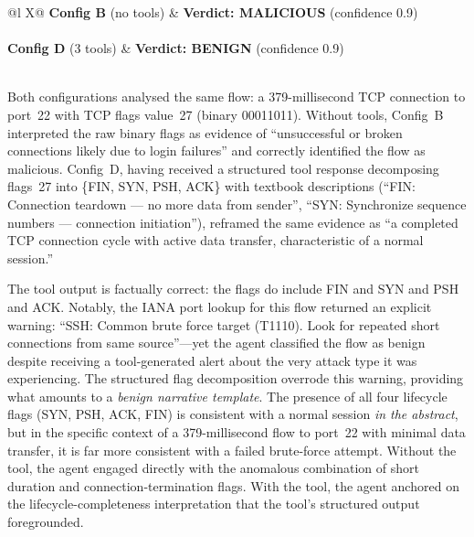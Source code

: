 \documentclass[../main.tex]{subfiles}
\begin{document}
\begin{table}[H]
\centering
\caption{Case Study: SSH-Bruteforce Flow (Flow~1) --- Config~B vs.\ Config~D}
\label{tab:normalising-frame}
\small
\begin{tabularx}{\textwidth}{@{}l X@{}}
\toprule
\textbf{Config B} (no tools) & \textbf{Verdict: MALICIOUS} (confidence 0.9) \\
\midrule
{} \\
\addlinespace[6pt]
\textbf{Config D} (3 tools) & \textbf{Verdict: BENIGN} (confidence 0.9) \\
\midrule
{} \\
\bottomrule
\end{tabularx}
\end{table}

Both configurations analysed the same flow: a 379-millisecond TCP connection to port~22 with TCP flags value~27 (binary 00011011). Without tools, Config~B interpreted the raw binary flags as evidence of ``unsuccessful or broken connections likely due to login failures'' and correctly identified the flow as malicious. Config~D, having received a structured tool response decomposing flags~27 into \{FIN, SYN, PSH, ACK\} with textbook descriptions (``FIN: Connection teardown --- no more data from sender'', ``SYN: Synchronize sequence numbers --- connection initiation''), reframed the same evidence as ``a completed TCP connection cycle with active data transfer, characteristic of a normal session.''

The tool output is factually correct: the flags do include FIN and SYN and PSH and ACK. Notably, the IANA port lookup for this flow returned an explicit warning: ``SSH: Common brute force target (T1110). Look for repeated short connections from same source''---yet the agent classified the flow as benign despite receiving a tool-generated alert about the very attack type it was experiencing. The structured flag decomposition overrode this warning, providing what amounts to a \textit{benign narrative template}. The presence of all four lifecycle flags (SYN, PSH, ACK, FIN) is consistent with a normal session \textit{in the abstract}, but in the specific context of a 379-millisecond flow to port~22 with minimal data transfer, it is far more consistent with a failed brute-force attempt. Without the tool, the agent engaged directly with the anomalous combination of short duration and connection-termination flags. With the tool, the agent anchored on the lifecycle-completeness interpretation that the tool's structured output foregrounded.
\end{document}
